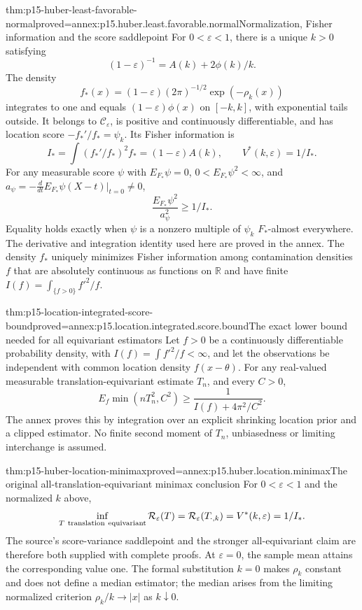 \begin{hbtheorem}{thm:p15-huber-least-favorable-normal}{proved=annex:p15.huber.least.favorable.normal}{Normalization, Fisher information and the score saddlepoint}
For \(0<\varepsilon<1\), there is a unique \(k>0\) satisfying
\[
 (1-\varepsilon)^{-1}=A(k)+2\phi(k)/k.
\]
The density
\[
 f_*(x)=(1-\varepsilon)(2\pi)^{-1/2}\exp(-\rho_k(x))
\]
integrates to one and equals
\((1-\varepsilon)\phi(x)\) on \([-k,k]\), with exponential tails
outside. It belongs to \(\mathcal C_\varepsilon\), is positive and
continuously differentiable, and has location score
\(-f_*'/f_*=\psi_k\). Its Fisher information is
\[
 I_*=\int(f_*'/f_*)^2f_*=(1-\varepsilon)A(k),
 \qquad V^*(k,\varepsilon)=1/I_*.
\]
For any measurable score \(\psi\) with \(E_{F_*}\psi=0\),
\(0<E_{F_*}\psi^2<\infty\), and
\(a_\psi=-\frac{d}{dt}E_{F_*}\psi(X-t)|_{t=0}\ne0\),
\[
 \frac{E_{F_*}\psi^2}{a_\psi^2}\geq1/I_*.
\]
Equality holds exactly when \(\psi\) is a nonzero multiple of \(\psi_k\)
\(F_*\)-almost everywhere. The derivative and integration identity
used here are proved in the annex.
The density \(f_*\) uniquely minimizes Fisher information among
contamination densities \(f\) that are absolutely continuous as
functions on \(\mathbb R\) and have finite
\(I(f)=\int_{\{f>0\}}f'^2/f\).
\end{hbtheorem}

\begin{hbtheorem}{thm:p15-location-integrated-score-bound}{proved=annex:p15.location.integrated.score.bound}{The exact lower bound needed for all equivariant estimators}
Let \(f>0\) be a continuously differentiable probability density,
with \(I(f)=\int f'^2/f<\infty\), and let the observations be
independent with common location density \(f(x-\theta)\).
For any real-valued measurable
translation-equivariant estimate \(T_n\), and every \(C>0\),
\[
 E_f\min(nT_n^2,C^2)\geq
                 \frac1{I(f)+4\pi^2/C^2}.
\]
The annex proves this by integration over an explicit shrinking
location prior and a clipped estimator. No finite second moment
of \(T_n\), unbiasedness or limiting interchange is assumed.
\end{hbtheorem}

\begin{hbtheorem}{thm:p15-huber-location-minimax}{proved=annex:p15.huber.location.minimax}{The original all-translation-equivariant minimax conclusion}
For \(0<\varepsilon<1\) and the normalized \(k\) above,
\[
 \inf_{T\ {\rm translation\ equivariant}}
        \mathcal R_\varepsilon(T)
 =\mathcal R_\varepsilon(T_{\cdot,k})
 =V^*(k,\varepsilon)=1/I_*.
\]
The source's score-variance saddlepoint and the stronger all-equivariant
claim are therefore both supplied with complete proofs.
At \(\varepsilon=0\), the sample mean attains the corresponding value one.
The formal substitution \(k=0\) makes \(\rho_k\) constant and does
not define a median estimator; the median arises from the limiting
normalized criterion \(\rho_k/k\to|x|\) as \(k\downarrow0\).
\end{hbtheorem}

